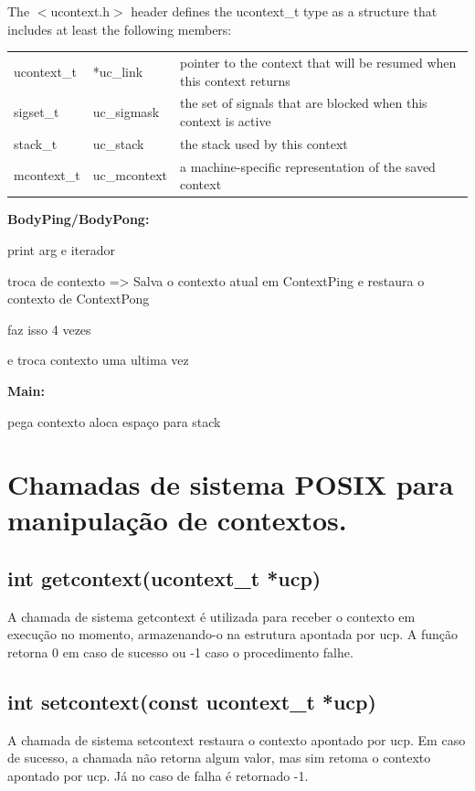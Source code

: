 \documentclass[12pt]{article}
\begin{document}
The $<$ucontext.h$>$ header defines the ucontext\_t type as a structure that includes at least the following members:

\begin{table}[H]
	\centering
	\label{my-label}
	\begin{tabular}{|l|l|l|}
		\hline 
		ucontext\_t & *uc\_link    & pointer to the context that will be resumed when this context returns \\
		sigset\_t   & uc\_sigmask  & the set of signals that are blocked when this context is active       \\
		stack\_t    & uc\_stack    & the stack used by this context                                        \\
		mcontext\_t & uc\_mcontext & a machine-specific representation of the saved context          \\
		\hline      
	\end{tabular}
\end{table}


\textbf{\large BodyPing/BodyPong:}

print arg e iterador

troca de contexto => Salva o contexto atual em ContextPing e restaura o contexto de ContextPong

faz isso 4 vezes

e troca contexto uma ultima vez

\textbf{\large Main:}

pega contexto
aloca espaço para stack


\section{Chamadas de sistema POSIX para manipulação de contextos.}

	\subsection{int getcontext(ucontext\_t *ucp)}
	A chamada de sistema getcontext é utilizada para receber o contexto em execução no momento, armazenando-o na estrutura apontada por ucp.
	A função retorna 0 em caso de sucesso ou -1 caso o procedimento falhe.
	
	
	\subsection{int setcontext(const ucontext\_t *ucp)}
	A chamada de sistema setcontext restaura o contexto apontado por ucp. Em caso de sucesso, a chamada não retorna algum valor, mas sim retoma o contexto apontado por ucp. Já no caso de falha é retornado -1.
	
\end{document}
